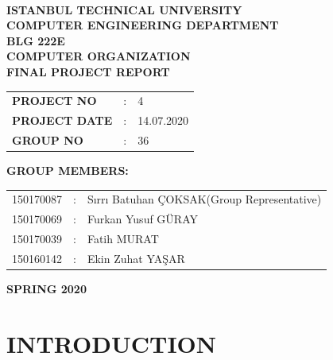 \documentclass[pdftex,12pt,a4paper]{article}
\begin{document}
\begin{titlepage}
\begin{center}
\textbf{}\\
\textbf{\Large{ISTANBUL TECHNICAL UNIVERSITY}}\\
\vspace{0.5cm}
\textbf{\Large{COMPUTER ENGINEERING DEPARTMENT}}\\
\vspace{2cm}
\textbf{\Large{BLG 222E\\ COMPUTER ORGANIZATION\\ FINAL PROJECT REPORT}}\\
\vspace{2.8cm}
\begin{table}[ht]
\centering
\Large{
\begin{tabular}{lcl}
\textbf{PROJECT NO}  & : & 4 \\
\textbf{PROJECT DATE}  & : & 14.07.2020 \\
\textbf{GROUP NO}  & : & 36 \\
\end{tabular}}
\end{table}
\vspace{1cm}
\textbf{\Large{GROUP MEMBERS:}}\\
\begin{table}[ht]
\centering
\Large{
\begin{tabular}{rcl}
150170087  & : & Sırrı Batuhan ÇOKSAK(Group Representative) \\
150170069  & : & Furkan Yusuf GÜRAY \\
150170039  & : & Fatih MURAT \\
150160142  & : & Ekin Zuhat YAŞAR \\
\end{tabular}}
\end{table}
\vspace{2.8cm}
\textbf{\Large{SPRING 2020}}

\end{center}

\end{titlepage}

\thispagestyle{empty}

\setcounter{tocdepth}{4}
\tableofcontents
\clearpage


\section{INTRODUCTION}
\par
\end{document}
